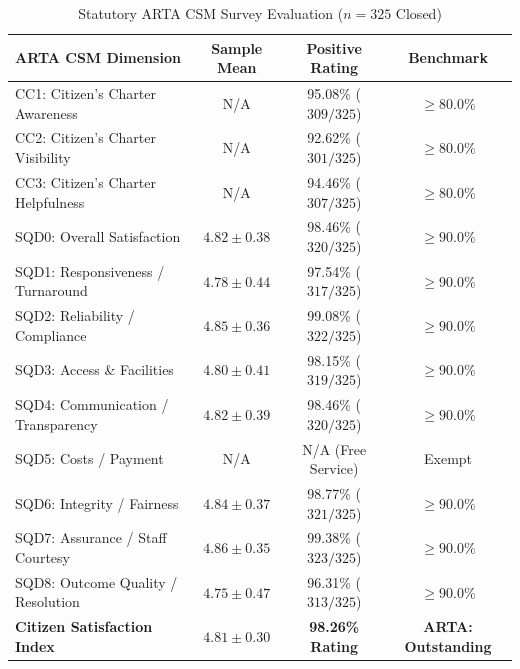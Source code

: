 \documentclass[conference]{IEEEtran}
\begin{document}
\begin{table}[htbp]
\caption{Statutory ARTA CSM Survey Evaluation ($n = 325$ Closed)}
\label{tab9}
\centering
\small
\begin{tabular}{lccc}
\toprule
\textbf{ARTA CSM Dimension} & \textbf{Sample Mean} & \textbf{Positive Rating} & \textbf{Benchmark} \\
\midrule
CC1: Citizen's Charter Awareness & N/A & 95.08\% ($309/325$) & $\ge 80.0\%$ \\
CC2: Citizen's Charter Visibility & N/A & 92.62\% ($301/325$) & $\ge 80.0\%$ \\
CC3: Citizen's Charter Helpfulness & N/A & 94.46\% ($307/325$) & $\ge 80.0\%$ \\
SQD0: Overall Satisfaction & $4.82 \pm 0.38$ & 98.46\% ($320/325$) & $\ge 90.0\%$ \\
SQD1: Responsiveness / Turnaround & $4.78 \pm 0.44$ & 97.54\% ($317/325$) & $\ge 90.0\%$ \\
SQD2: Reliability / Compliance & $4.85 \pm 0.36$ & 99.08\% ($322/325$) & $\ge 90.0\%$ \\
SQD3: Access \& Facilities & $4.80 \pm 0.41$ & 98.15\% ($319/325$) & $\ge 90.0\%$ \\
SQD4: Communication / Transparency & $4.82 \pm 0.39$ & 98.46\% ($320/325$) & $\ge 90.0\%$ \\
SQD5: Costs / Payment & N/A & N/A (Free Service) & Exempt \\
SQD6: Integrity / Fairness & $4.84 \pm 0.37$ & 98.77\% ($321/325$) & $\ge 90.0\%$ \\
SQD7: Assurance / Staff Courtesy & $4.86 \pm 0.35$ & 99.38\% ($323/325$) & $\ge 90.0\%$ \\
SQD8: Outcome Quality / Resolution & $4.75 \pm 0.47$ & 96.31\% ($313/325$) & $\ge 90.0\%$ \\
\midrule
\textbf{Citizen Satisfaction Index} & \textbf{$4.81 \pm 0.30$} & \textbf{98.26\% Rating} & \textbf{ARTA: Outstanding} \\
\bottomrule
\end{tabular}
\end{table}
\end{document}
